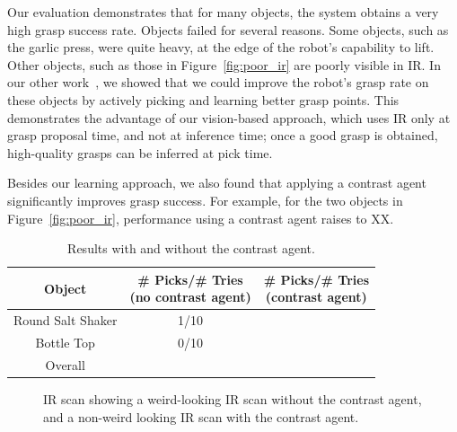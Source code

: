 \documentclass[graybox]{svmult}
\begin{document}
Our evaluation demonstrates that for many objects, the system obtains
a very high grasp success rate.  Objects failed for several reasons.
Some objects, such as the garlic press, were quite heavy, at the edge
of the robot's capability to lift.  Other objects, such as those in
Figure~\ref{fig:poor_ir} are poorly visible in IR.  In our other
work~\citep{oberlin15}, we showed that we could improve the robot's
grasp rate on these objects by actively picking and learning better
grasp points.  This demonstrates the advantage of our vision-based
approach, which uses IR only at grasp proposal time, and not at
inference time; once a good grasp is obtained, high-quality grasps can
be inferred at pick time.



Besides our learning approach, we also found that applying a contrast
agent significantly improves grasp success.  For example, for the two
objects in Figure~\ref{fig:poor_ir}, performance using a contrast
agent raises to XX.

\begin{table}
\begin{tabular}{ccc}
\toprule
Object		    & \parbox{0.3\linewidth}{\# Picks/\# Tries\\ (no contrast agent)} &\parbox{0.3\linewidth}{\# Picks/\# Tries\\ (contrast agent)}\\
\midrule
Round Salt Shaker   & 1/10  & \\
Bottle Top    	    & 0/10  & \\
\midrule
Overall             &       &\\
\bottomrule
\end{tabular}
\caption{Results with and without the contrast agent.}
\end{table}

\begin{figure}

\caption{IR scan showing a weird-looking IR scan without the contrast agent, and a non-weird looking IR scan with the contrast agent.}
\end{figure}
\end{document}
